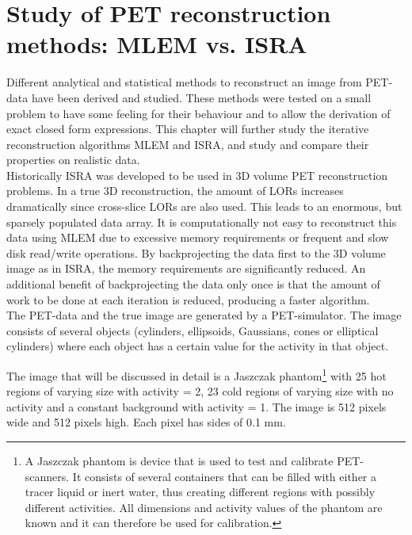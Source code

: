 \documentclass[report,12pt]{report}
\newcounter{chpt}
\begin{document}
\chapter{Study of PET reconstruction methods: MLEM vs. ISRA}\label{chpt:PETRecMethods}
Different analytical and statistical methods to reconstruct an image from PET-data have been derived and studied. These methods were tested on a small problem to have some feeling for their behaviour and to allow the derivation of exact closed form expressions. This chapter will further study the iterative reconstruction algorithms MLEM and ISRA, and study and compare their properties on realistic data.\\

Historically ISRA was developed to be used in 3D volume PET reconstruction problems. In a true 3D reconstruction, the amount of LORs increases dramatically since cross-slice LORs are also used. This leads to an enormous, but sparsely populated data array. It is computationally not easy to reconstruct this data using MLEM due to excessive memory requirements or frequent and slow disk read/write operations. By backprojecting the data first to the 3D volume image as in ISRA, the memory requirements are significantly reduced. An additional benefit of backprojecting the data only once is that the amount of work to be done at each iteration is reduced, producing a faster algorithm.\\

The PET-data and the true image are generated by a PET-simulator. The image consists of several objects (cylinders, ellipsoids, Gaussians, cones or elliptical cylinders) where each object has a certain value for the activity in that object.

The image that will be discussed in detail is a Jaszczak 
phantom\footnote{A Jaszczak phantom is device that is used to test and calibrate PET-scanners. It consists of several containers that can be filled with either a tracer liquid or inert water, thus creating different regions with possibly different activities. All dimensions and activity values of the phantom are known and it can therefore be used for calibration.} \cite{Jaszczak} with 25 hot regions of varying size with activity = 2, 23 cold regions of varying size with no activity and a constant background with activity = 1. The image is 512 pixels wide and 512 pixels high. Each pixel has sides of 0.1 mm.\\
\end{document}
